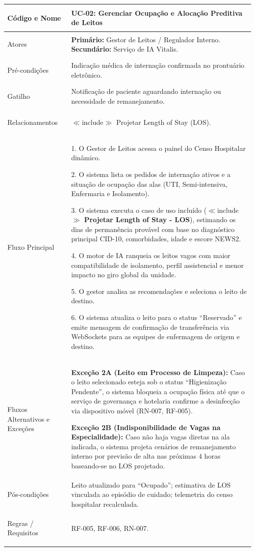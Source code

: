 \begingroup
\small
\begin{tabularx}{\textwidth}{>{\bfseries\raggedright\arraybackslash}p{3.4cm} X}
\toprule
Código e Nome & UC-02: Gerenciar Ocupação e Alocação Preditiva de Leitos \\
\midrule
Atores & \textbf{Primário:} Gestor de Leitos / Regulador Interno. \textbf{Secundário:} Serviço de IA Vitalis. \\
Pré-condições & Indicação médica de internação confirmada no prontuário eletrônico. \\
Gatilho & Notificação de paciente aguardando internação ou necessidade de remanejamento. \\
Relacionamentos & $\ll$include$\gg$ Projetar Length of Stay (LOS). \\
\midrule
Fluxo Principal & 
1. O Gestor de Leitos acessa o painel do Censo Hospitalar dinâmico.\par
2. O sistema lista os pedidos de internação ativos e a situação de ocupação das alas (UTI, Semi-intensiva, Enfermaria e Isolamento).\par
3. O sistema executa o caso de uso incluído ($\ll$include$\gg$ \textbf{Projetar Length of Stay - LOS}), estimando os dias de permanência provável com base no diagnóstico principal CID-10, comorbidades, idade e escore NEWS2.\par
4. O motor de IA ranqueia os leitos vagos com maior compatibilidade de isolamento, perfil assistencial e menor impacto no giro global da unidade.\par
5. O gestor analisa as recomendações e seleciona o leito de destino.\par
6. O sistema atualiza o leito para o status ``Reservado'' e emite mensagem de confirmação de transferência via WebSockets para as equipes de enfermagem de origem e destino. \\
\midrule
Fluxos Alternativos e Exceções & 
\textbf{Exceção 2A (Leito em Processo de Limpeza):} Caso o leito selecionado esteja sob o status ``Higienização Pendente'', o sistema bloqueia a ocupação física até que o serviço de governança e hotelaria confirme a desinfecção via dispositivo móvel (RN-007, RF-005).\par
\textbf{Exceção 2B (Indisponibilidade de Vagas na Especialidade):} Caso não haja vagas diretas na ala indicada, o sistema projeta cenários de remanejamento interno por previsão de alta nas próximas $4$ horas baseando-se no LOS projetado. \\
\midrule
Pós-condições & Leito atualizado para ``Ocupado''; estimativa de LOS vinculada ao episódio de cuidado; telemetria do censo hospitalar recalculada. \\
Regras / Requisitos & RF-005, RF-006, RN-007. \\
\bottomrule
\end{tabularx}
\endgroup

